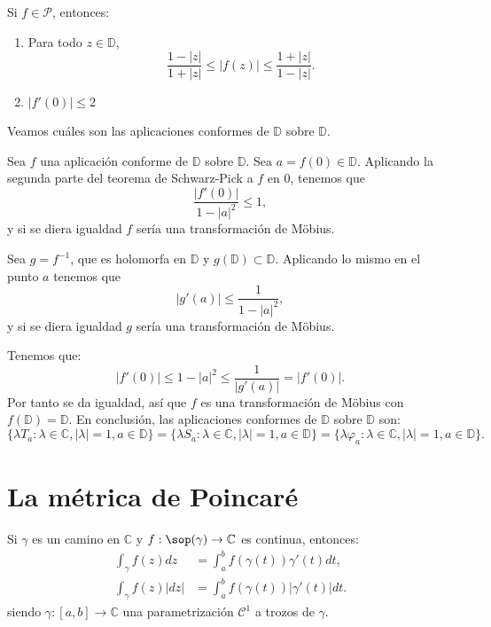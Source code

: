 \begin{theorem}
    Si $f \in \mathcal{P}$, entonces:
    \begin{enumerate}
        \item Para todo $z \in \mathbb{D}$,
              $$\frac{1-|z|}{1+|z|} \leq |f(z)| \leq \frac{1+|z|}{1-|z|}.$$
        \item $|f'(0)| \leq 2$
    \end{enumerate}
\end{theorem}

Veamos cuáles son las aplicaciones conformes de $\mathbb{D}$ sobre $\mathbb{D}$.

Sea $f$ una aplicación conforme de $\mathbb{D}$ sobre $\mathbb{D}$.
Sea $a = f(0) \in \mathbb{D}$.
Aplicando la segunda parte del teorema de Schwarz-Pick a $f$ en 0, tenemos que
$$\frac{|f'(0)|}{1-|a|^2} \leq 1,$$
y si se diera igualdad $f$ sería una transformación de Möbius.

Sea $g = f^{-1}$, que es holomorfa en $\mathbb{D}$ y $g(\mathbb{D}) \subset \mathbb{D}$.
Aplicando lo mismo en el punto $a$ tenemos que
$$|g'(a)| \leq \frac{1}{1-|a|^2},$$
y si se diera igualdad $g$ sería una transformación de Möbius.

Tenemos que:
$$|f'(0)| \leq 1-|a|^2 \leq \frac{1}{|g'(a)|} = |f'(0)|.$$
Por tanto se da igualdad, así que $f$ es una transformación de Möbius con $f(\mathbb{D}) = \mathbb{D}$.
En conclusión, las aplicaciones conformes de $\mathbb{D}$ sobre $\mathbb{D}$ son:
$$\{\lambda T_a : \lambda \in \mathbb{C}, |\lambda| = 1, a \in \mathbb{D}\} = \{\lambda S_a : \lambda \in \mathbb{C}, |\lambda| = 1, a \in \mathbb{D}\} = \{\lambda \varphi_a : \lambda \in \mathbb{C}, |\lambda| = 1, a \in \mathbb{D}\}.$$

\section{La métrica de Poincaré}
Si $\gamma$ es un camino en $\mathbb{C}$ y $f: \sop(\gamma) \to \mathbb{C}$ es continua, entonces:
\begin{align*}
    \int_\gamma f(z)dz   & = \int_a^b f(\gamma(t))\gamma'(t)dt,   \\
    \int_\gamma f(z)|dz| & = \int_a^b f(\gamma(t))|\gamma'(t)|dt.
\end{align*}
siendo $\gamma: [a, b] \to \mathbb{C}$ una parametrización $\mathcal{C}^1$ a trozos de $\gamma$.


